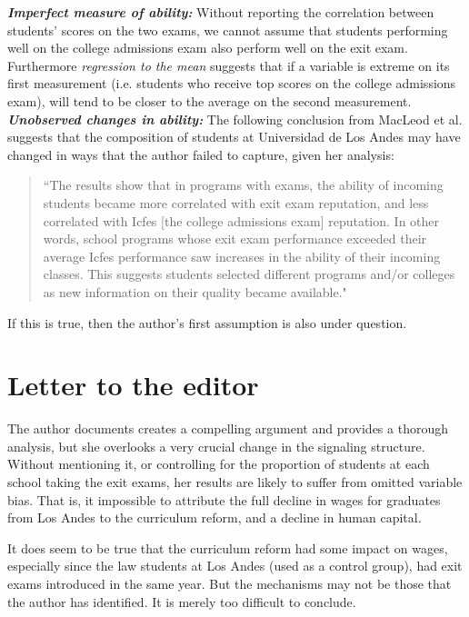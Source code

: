 \documentclass[a4paper, 11pt]{article}
\begin{document}
\noindent \textbf{\textit{Imperfect measure of ability:}} Without reporting the correlation between students' scores on the two exams, we cannot assume that students performing well on the college admissions exam also perform well on the exit exam.  Furthermore \textit{regression to the mean} suggests that if a variable is extreme on its first measurement (i.e. students who receive top scores on the college admissions exam), will tend to be closer to the average on the second measurement.  
\\

\noindent \textbf{\textit{Unobserved changes in ability:}} The following conclusion from MacLeod et al. suggests that the composition of students at Universidad de Los Andes may have changed in ways that the author failed to capture, given her analysis:
\begin{quote}
``The results show that in programs with exams, the ability of incoming students became more correlated with exit exam reputation, and less correlated with Icfes [the college admissions exam] reputation. In other words, school programs whose exit exam performance exceeded their average Icfes performance saw increases in the ability of their incoming classes.  This suggests students selected different programs and/or colleges as new information on their quality became available."
\end{quote}

\noindent If this is true, then the author's first assumption is also under question. 
\newpage
\section*{Letter to the editor}


The author documents creates a compelling argument and provides a thorough analysis, but she overlooks a very crucial change in the signaling structure.  Without mentioning it, or controlling for the proportion of students at each school taking the exit exams, her results are likely to suffer from omitted variable bias.  That is, it impossible to attribute the full decline in wages for graduates from Los Andes to the curriculum reform, and a decline in human capital.

It does seem to be true that the curriculum reform had some impact on wages, especially since the law students at Los Andes (used as a control group), had exit exams introduced in the same year.  But the mechanisms may not be those that the author has identified.  It is merely too difficult to conclude. 
\end{document}
